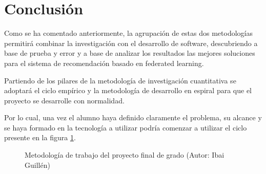 \section{Conclusión}
Como se ha comentado anteriormente, la agrupación de estas dos metodologías permitirá combinar la investigación con el desarrollo de software, descubriendo a base de prueba y error y a base de analizar los resultados las mejores soluciones para el sistema de recomendación basado en federated learning.

Partiendo de los pilares de la metodología de investigación cuantitativa se adoptará el ciclo empírico y la metodología de desarrollo en espiral para que el proyecto se desarrolle con normalidad.

Por lo cual, una vez el alumno haya definido claramente el problema, su alcance y se haya formado en la tecnología a utilizar podría comenzar a utilizar el ciclo presente en la figura \ref{fig:MetodologiaCombinada}.

\begin{figure}[thbp]
    \centering
    \caption{Metodología de trabajo del proyecto final de grado (Autor: Ibai Guillén)} 
    \label{fig:MetodologiaCombinada}
\end{figure}